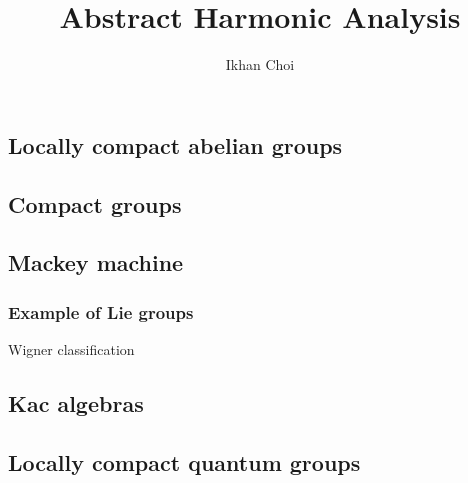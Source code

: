 \documentclass{../note}
\begin{document}
\title{Abstract Harmonic Analysis}
\author{Ikhan Choi}
\maketitle
\tableofcontents

\part{}
\chapter{Locally compact abelian groups}

\chapter{Compact groups}

\chapter{Mackey machine}

\section{Example of Lie groups}
Wigner classification

\chapter{Kac algebras}

\chapter{Locally compact quantum groups}
\end{document}
